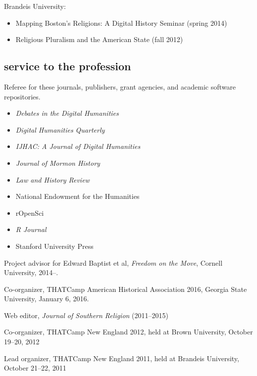 \documentclass[11pt]{article}
\providecommand{\tightlist}{%
  \setlength{\itemsep}{0pt}\setlength{\parskip}{0pt}}
\begin{document}
\vspace{-0.1in}

Brandeis University:

\vspace{-0.2in}

\begin{itemize}
    \tightlist
  \item
    Mapping Boston's Religions: A Digital History Seminar (spring 2014)
  \item
    Religious Pluralism and the American State (fall 2012)
\end{itemize}

\subsection{service to the profession}\label{service-profession}

Referee for these journals, publishers, grant agencies, and academic software repositories.

\vspace{-0.25in}
\begin{itemize}
    \tightlist
  \item \emph{Debates in the Digital Humanities}
  \item \emph{Digital Humanities Quarterly}
  \item \emph{IJHAC: A Journal of Digital Humanities}
  \item \emph{Journal of Mormon History}
  \item \emph{Law and History Review}
  \item National Endowment for the Humanities
  \item rOpenSci
  \item \emph{R Journal}
  \item Stanford University Press
\end{itemize}

Project advisor for Edward Baptist et al, \emph{Freedom on the Move}, Cornell 
University, 2014--.

Co-organizer, THATCamp American Historical Association 2016, Georgia State University, January 6, 2016.

Web editor, \emph{Journal of Southern Religion} (2011--2015)

Co-organizer, THATCamp New England 2012, held at Brown University,
October 19--20, 2012

Lead organizer, THATCamp New England 2011, held at Brandeis University,
October 21--22, 2011
\end{document}
